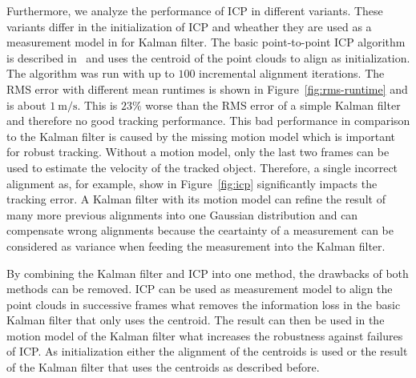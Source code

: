 \documentclass[twoside,a4paper,article]{combine}
\begin{document}
Furthermore, we analyze the performance of ICP in different
variants. These variants differ in the initialization of ICP and
wheather they are used as a measurement model in for Kalman
filter. The basic point-to-point ICP algorithm is described
in~\cite{icp-basic} and uses the centroid of the point clouds to align
as initialization. The algorithm was run with up to $100$ incremental
alignment iterations. The RMS error with different mean runtimes is
shown in Figure~\ref{fig:rms-runtime} and is about
$1\mathrm{~m/s}$. This is $23\%$ worse than the RMS error of a simple
Kalman filter and therefore no good tracking performance. This bad
performance in comparison to the Kalman filter is caused by the
missing motion model which is important for robust tracking. Without a
motion model, only the last two frames can be used to estimate the
velocity of the tracked object. Therefore, a single incorrect
alignment as, for example, show in Figure~\ref{fig:icp} significantly
impacts the tracking error. A Kalman filter with its motion model
can refine the result of many more previous alignments into one
Gaussian distribution and can compensate wrong alignments because the
ceartainty of a measurement can be considered as variance when feeding
the measurement into the Kalman filter. 

By combining the Kalman filter and ICP into one method, the drawbacks
of both methods can be removed. ICP can be used as measurement model
to align the point clouds in successive frames what removes the
information loss in the basic Kalman filter that only uses the
centroid. The result can then be used in the motion model of the
Kalman filter what increases the robustness against failures of
ICP. As initialization either the alignment of the centroids is used
or the result of the Kalman filter that uses the centroids as
described before.
\end{document}
